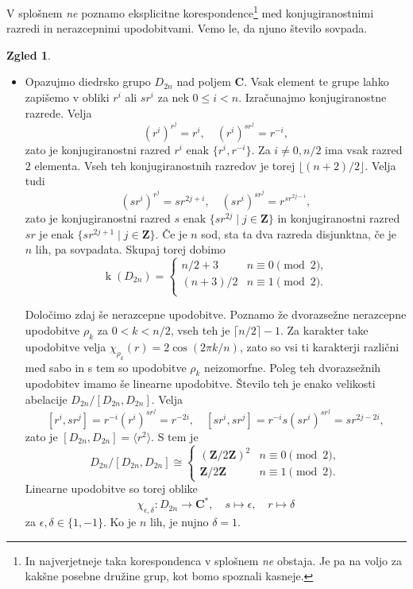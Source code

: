 \documentclass[11pt]{book}
\def\ZZ{\mathbf{Z}}
\def\CC{\mathbf{C}}
\DeclareMathOperator\kk{k}
\theoremstyle{definition}
\theoremstyle{zgled}
\newtheorem*{zgled}{Zgled}
\theoremstyle{odprtproblem}
\theoremstyle{domacanaloga}
\theoremstyle{izrek}
\begin{document}
V splošnem \emph{ne} poznamo eksplicitne korespondence\footnote{In najverjetneje taka korespondenca v splošnem \emph{ne} obstaja. Je pa na voljo za kakšne posebne družine grup, kot bomo spoznali kasneje.}  med konjugiranostnimi razredi in nerazcepnimi upodobitvami. Vemo le, da njuno število sovpada.

\begin{zgled} \leavevmode
\begin{itemize}
\item Opazujmo diedrsko grupo $D_{2n}$ nad poljem $\CC$. Vsak element te grupe lahko zapišemo v obliki $r^i$ ali $s r^i$ za nek $0 \leq i < n$. Izračunajmo konjugiranostne razrede. Velja
\[
    \left( r^i \right)^{r^j} = r^i, \quad
    \left( r^i \right)^{s r^j} = r^{-i},
\]
zato je konjugiranostni razred $r^i$ enak $\{ r^{i}, r^{-i} \}$. Za $i \neq 0, n/2$ ima vsak razred $2$ elementa. Vseh teh konjugiranostnih razredov je torej $\lfloor (n+2)/2 \rfloor$.
Velja tudi
\[
    \left( s r^i \right)^{r^j} = s r^{2j + i}, \quad
    \left( s r^i \right)^{s r^j} = r^{s r^{2j - i}},   
\]
zato je konjugiranostni razred $s$ enak $\{ s r^{2j} \mid j \in \ZZ \}$ in konjugiranostni razred $sr$ je enak $\{ s r^{2j + 1} \mid j \in \ZZ \}$. Če je $n$ sod, sta ta dva razreda disjunktna, če je $n$ lih, pa sovpadata. Skupaj torej dobimo
\[
    \kk(D_{2n}) = \begin{cases}
        n/2 + 3 & n \equiv 0 \pmod{2}, \\
        (n+3)/2 & n \equiv 1 \pmod{2}. \\
    \end{cases}
\]

Določimo zdaj še nerazcepne upodobitve. Poznamo že dvorazsežne nerazcepne upodobitve $\rho_k$ za $0 < k < n/2$, vseh teh je $\lceil n/2 \rceil - 1$. Za karakter take upodobitve velja $\chi_{\rho_k}(r) = 2 \cos(2 \pi k / n)$, zato so vsi ti karakterji različni med sabo in s tem so upodobitve $\rho_k$ neizomorfne. Poleg teh dvorazsežnih upodobitev imamo še linearne upodobitve. Število teh je enako velikosti abelacije $D_{2n}/[D_{2n}, D_{2n}]$. Velja
\[
    [r^i, s r^j] = r^{-i} \left( r^i \right)^{s r^j} = r^{-2i}, \quad
    [s r^i, s r^j] = r^{-i} s \left( s r^i \right)^{s r^j} = s r^{2j - 2i},
\]
zato je $[D_{2n}, D_{2n}] = \langle r^2 \rangle$. S tem je 
\[
    D_{2n}/[D_{2n}, D_{2n}] \cong \begin{cases}
        (\ZZ/2\ZZ)^2 & n \equiv 0 \pmod{2}, \\
        \ZZ/2\ZZ & n \equiv 1 \pmod{2}.
    \end{cases}
\]
Linearne upodobitve so torej oblike
\[
    \chi_{\epsilon, \delta} \colon D_{2n} \to \CC^*, \quad
    s \mapsto \epsilon, \quad
    r \mapsto \delta
\]
za $\epsilon, \delta \in \{ 1, -1 \}$. Ko je $n$ lih, je nujno $\delta = 1$.


\end{itemize}
\end{zgled}
\end{document}
